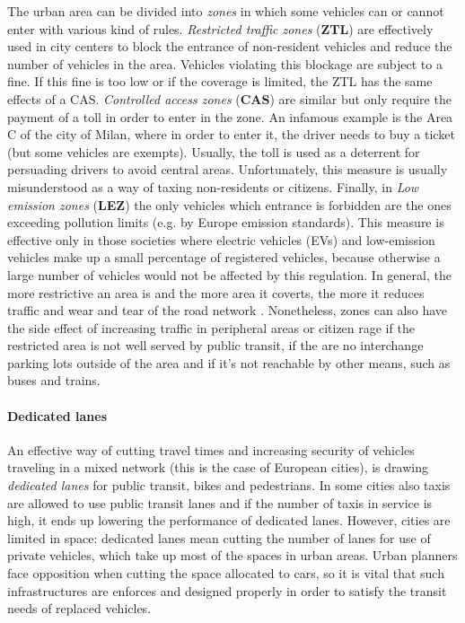 The urban area can be divided into \textit{zones} in which some vehicles can or cannot enter with various kind of rules.
\textit{Restricted traffic zones} (\textbf{ZTL}) are effectively used in city centers to block the entrance of non-resident vehicles and reduce the number of vehicles in the area. Vehicles violating this blockage are subject to a fine. If this fine is too low or if the coverage is limited, the ZTL has the same effects of a CAS.
\textit{Controlled access zones} (\textbf{CAS}) are similar but only require the payment of a toll in order to enter in the zone. An infamous example is the Area C of the city of Milan, where in order to enter it, the driver needs to buy a ticket (but some vehicles are exempts). Usually, the toll is used as a deterrent for persuading drivers to avoid central areas. Unfortunately, this measure is usually misunderstood as a way of taxing non-residents or citizens.
Finally, in \textit{Low emission zones} (\textbf{LEZ}) the only vehicles which entrance is forbidden are the ones exceeding pollution limits (e.g. by Europe emission standards). This measure is effective only in those societies where electric vehicles (EVs) and low-emission vehicles make up a small percentage of registered vehicles, because otherwise a large number of vehicles would not be affected by this regulation.
In general, the more restrictive an area is and the more area it coverts, the more it reduces traffic and wear and tear of the road network \cite{derobertis2016traffic}. Nonetheless, zones can also have the side effect of increasing traffic in peripheral areas or citizen rage if the restricted area is not well served by public transit, if the are no interchange parking lots outside of the area and if it's not reachable by other means, such as buses and trains.

\paragraph{Dedicated lanes}

An effective way of cutting travel times and increasing security of vehicles traveling in a mixed network (this is the case of European cities), is drawing \textit{dedicated lanes} for public transit, bikes and pedestrians. In some cities also taxis are allowed to use public transit lanes and if the number of taxis in service is high, it ends up lowering the performance of dedicated lanes. However, cities are limited in space: dedicated lanes mean cutting the number of lanes for use of private vehicles, which take up most of the spaces in urban areas. Urban planners face opposition when cutting the space allocated to cars, so it is vital that such infrastructures are enforces and designed properly in order to satisfy the transit needs of replaced vehicles.


